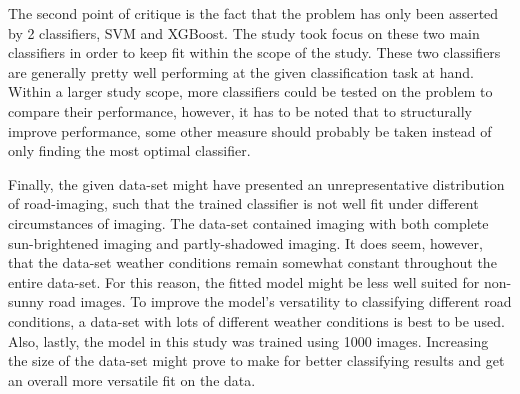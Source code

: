 The second point of critique is the fact that the problem has only been asserted by 2 classifiers, SVM and XGBoost. The study took focus on these two main classifiers in order to keep fit within the scope of the study. These two classifiers are generally pretty well performing at the given classification task at hand. Within a larger study scope, more classifiers could be tested on the problem to compare their performance, however, it has to be noted that to structurally improve performance, some other measure should probably be taken instead of only finding the most optimal classifier.

Finally, the given data-set might have presented an unrepresentative distribution of road-imaging, such that the trained classifier is not well fit under different circumstances of imaging. The data-set contained imaging with both complete sun-brightened imaging and partly-shadowed imaging. It does seem, however, that the data-set weather conditions remain somewhat constant throughout the entire data-set. For this reason, the fitted model might be less well suited for non-sunny road images. To improve the model's versatility to classifying different road conditions, a data-set with lots of different weather conditions is best to be used. Also, lastly, the model in this study was trained using 1000 images. Increasing the size of the data-set might prove to make for better classifying results and get an overall more versatile fit on the data.
